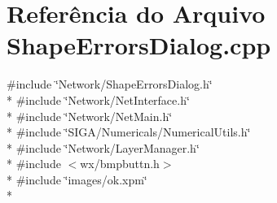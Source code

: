 \section{Referência do Arquivo Shape\+Errors\+Dialog.\+cpp}
\label{_shape_errors_dialog_8cpp}
{\ttfamily \#include \char`\"{}Network/\+Shape\+Errors\+Dialog.\+h\char`\"{}}\\*
{\ttfamily \#include \char`\"{}Network/\+Net\+Interface.\+h\char`\"{}}\\*
{\ttfamily \#include \char`\"{}Network/\+Net\+Main.\+h\char`\"{}}\\*
{\ttfamily \#include \char`\"{}S\+I\+G\+A/\+Numericals/\+Numerical\+Utils.\+h\char`\"{}}\\*
{\ttfamily \#include \char`\"{}Network/\+Layer\+Manager.\+h\char`\"{}}\\*
{\ttfamily \#include $<$wx/bmpbuttn.\+h$>$}\\*
{\ttfamily \#include \char`\"{}images/ok.\+xpm\char`\"{}}\\*

